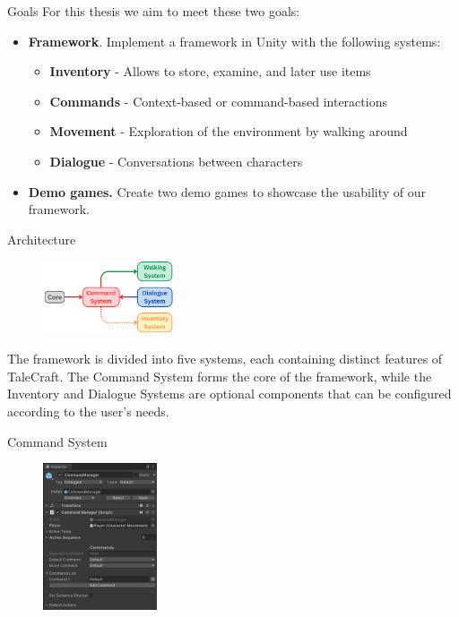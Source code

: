 \documentclass[portrait,a0paper,fontscale=0.35]{baposter}
\begin{document}
\begin{poster}
\begin{posterbox}[column=0, span=1, name=goals, below=background, headerColorOne=cyan!40, boxColorOne=cyan!10]{Goals}
For this thesis we aim to meet these two goals:
\begin{itemize}
\item \textbf{Framework}. Implement a framework in Unity with the following systems:
\begin{itemize}
    \item \textbf{Inventory} - Allows to store, examine, and later use items
    \item \textbf{Commands} - Context-based or command-based interactions
    \item \textbf{Movement} - Exploration of the environment by walking around
    \item \textbf{Dialogue} - Conversations between characters
\end{itemize}
\item \textbf{Demo games.} Create two demo games to showcase the usability of our framework.
\end{itemize}

\end{posterbox}

\begin{posterbox}[column=0, span=1, name=architecture, below=goals]{Architecture}

\begin{figure}
\centering
\includegraphics[width=0.35\textwidth]{img/framework.png}
\end{figure}
The framework is divided into five systems, each containing distinct features of TaleCraft. The Command System forms the core of the framework, while the Inventory and Dialogue Systems are optional components that can be configured according to the user's needs.
\begin{center}
\end{center}
\end{posterbox}

\begin{posterbox}[column=0, span=1, name=cs, below=architecture]{Command System}

\begin{figure}
\centering
\includegraphics[width=0.3\textwidth]{img/image_2025-07-08_214350710.png}
\end{figure}


\end{posterbox}
\end{poster}
\end{document}
